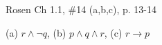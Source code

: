\documentclass[12pt,addpoints]{exam}
\begin{document}
\begin{questions}
\question Rosen Ch 1.1, \#14 (a,b,c), p. 13-14
    \ifprintanswers
        \vspace{-15pt}
    \fi
    \begin{solution} (a) $r \wedge \neg q$, \hspace{0.2in} (b) $p \wedge q \wedge r$, \hspace{0.2in} (c) $r \rightarrow p$


\end{solution}
\end{questions}
\end{document}
